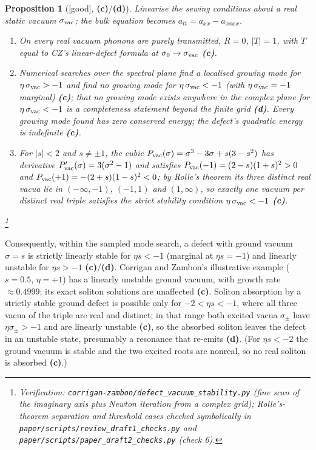 \documentclass[11pt,a4paper]{article}
\newcommand{\lab}[1]{{\normalfont\sffamily\footnotesize\bfseries(#1)}}
\newcommand{\Lc}{\lab{c}}
\newcommand{\Ld}{\lab{d}}
\newcommand{\eqtag}[2]{{\normalfont\sffamily\footnotesize\textcolor{#1}{[#2]}}}
\newcommand{\Good}{\eqtag{teal!70!black}{good}}
\newcommand{\scr}[1]{\nolinkurl{#1}}
\newcommand{\chk}[1]{\footnote{\raggedright Verification: #1.}}
\newtheorem{proposition}{Proposition}[section]
\theoremstyle{remark}
\begin{document}
\begin{proposition}[\Good, \Lc/\Ld]\label{prop:stab}
Linearise the sewing conditions about a real static vacuum $\sigma_{\rm vac}$; the bulk equation becomes $a_{tt}=a_{xx}-a_{xxxx}$.
\begin{enumerate}
\item On every real vacuum phonons are purely transmitted, $R=0$, $|T|=1$, with $T$ equal to CZ's linear-defect formula \cite[(4.6)]{CZ} at $\sigma_0\to\sigma_{\rm vac}$ \Lc.
\item Numerical searches over the spectral plane find a localised growing mode for $\eta\,\sigma_{\rm vac}>-1$ and find no growing mode for $\eta\,\sigma_{\rm vac}<-1$ (with $\eta\,\sigma_{\rm vac}=-1$ marginal) \Lc; that no growing mode exists anywhere in the complex plane for $\eta\,\sigma_{\rm vac}<-1$ is a completeness statement beyond the finite grid \Ld. Every growing mode found has zero conserved energy; the defect's quadratic energy is indefinite \Lc.
\item For $|s|<2$ and $s\neq\pm1$, the cubic $P_{\rm vac}(\sigma)=\sigma^3-3\sigma+s(3-s^2)$ has derivative $P_{\rm vac}'(\sigma)=3(\sigma^2-1)$ and satisfies $P_{\rm vac}(-1)=(2-s)(1+s)^2>0$ and $P_{\rm vac}(+1)=-(2+s)(1-s)^2<0$; by Rolle's theorem its three distinct real vacua lie in $(-\infty,-1)$, $(-1,1)$ and $(1,\infty)$, so \emph{exactly one vacuum per distinct real triple satisfies the strict stability condition $\eta\,\sigma_{\rm vac}<-1$} \Lc.
\end{enumerate}
\chk{\scr{corrigan-zambon/defect_vacuum_stability.py} (fine scan of the imaginary axis plus Newton iteration from a complex grid); Rolle's-theorem separation and threshold cases checked symbolically in \scr{paper/scripts/review_draft1_checks.py} and \scr{paper/scripts/paper_draft2_checks.py} (check 6)}
\end{proposition}

Consequently, within the sampled mode search, a defect with ground vacuum $\sigma=s$ is strictly linearly stable for $\eta s<-1$ (marginal at $\eta s=-1$) and linearly unstable for $\eta s>-1$ \Lc/\Ld. Corrigan and Zambon's illustrative example ($s=0.5$, $\eta=+1$) has a linearly unstable ground vacuum, with growth rate $\approx0.4999$; its exact soliton solutions are unaffected \Lc. Soliton absorption by a strictly stable ground defect is possible only for $-2<\eta s<-1$, where all three vacua of the triple are real and distinct; in that range both excited vacua $\sigma_\pm$ have $\eta\sigma_\pm>-1$ and are linearly unstable \Lc, so the absorbed soliton leaves the defect in an unstable state, presumably a resonance that re-emits \Ld. (For $\eta s<-2$ the ground vacuum is stable and the two excited roots are nonreal, so no real soliton is absorbed \Lc.)
\end{document}
